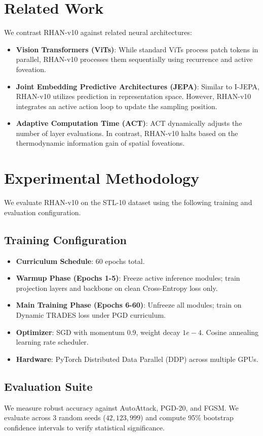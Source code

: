 \section{Related Work}
We contrast RHAN-v10 against related neural architectures:
\begin{itemize}
    \item \textbf{Vision Transformers (ViTs)}: While standard ViTs process patch tokens in parallel, RHAN-v10 processes them sequentially using recurrence and active foveation.
    \item \textbf{Joint Embedding Predictive Architectures (JEPA)}: Similar to I-JEPA, RHAN-v10 utilizes prediction in representation space. However, RHAN-v10 integrates an active action loop to update the sampling position.
    \item \textbf{Adaptive Computation Time (ACT)}: ACT dynamically adjusts the number of layer evaluations. In contrast, RHAN-v10 halts based on the thermodynamic information gain of spatial foveations.
\end{itemize}

\section{Experimental Methodology}
We evaluate RHAN-v10 on the STL-10 dataset using the following training and evaluation configuration.

\subsection{Training Configuration}
\begin{itemize}
    \item \textbf{Curriculum Schedule}: 60 epochs total.
    \item \textbf{Warmup Phase (Epochs 1-5)}: Freeze active inference modules; train projection layers and backbone on clean Cross-Entropy loss only.
    \item \textbf{Main Training Phase (Epochs 6-60)}: Unfreeze all modules; train on Dynamic TRADES loss under PGD curriculum.
    \item \textbf{Optimizer}: SGD with momentum 0.9, weight decay $1e-4$. Cosine annealing learning rate scheduler.
    \item \textbf{Hardware}: PyTorch Distributed Data Parallel (DDP) across multiple GPUs.
\end{itemize}

\subsection{Evaluation Suite}
We measure robust accuracy against AutoAttack, PGD-20, and FGSM. We evaluate across 3 random seeds ($42, 123, 999$) and compute 95\% bootstrap confidence intervals to verify statistical significance.
